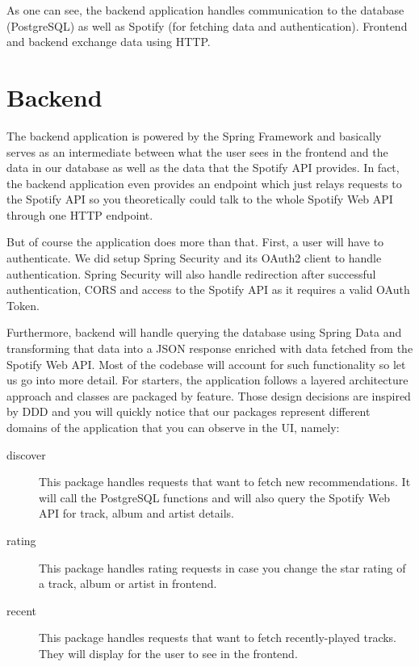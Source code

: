 As one can see, the backend application handles communication to the database (PostgreSQL) as well as Spotify (for fetching data and authentication). Frontend and backend exchange data using \ac{HTTP}.

\section{Backend}

The backend application is powered by the Spring Framework and basically serves as an intermediate between what the user sees in the frontend and the data in our database as well as the data that the Spotify API provides. In fact, the backend application even provides an endpoint which just relays requests to the Spotify API so you theoretically could talk to the whole Spotify Web API through one \ac{HTTP} endpoint.

But of course the application does more than that. First, a user will have to authenticate. We did setup Spring Security and its OAuth2 client to handle authentication. Spring Security will also handle redirection after successful authentication, \ac{CORS} and access to the Spotify API as it requires a valid OAuth Token.

Furthermore, backend will handle querying the database using Spring Data and transforming that data into a \acs{JSON} response enriched with data fetched from the Spotify Web API. Most of the codebase will account for such functionality so let us go into more detail. For starters, the application follows a layered architecture approach and classes are packaged by feature. Those design decisions are inspired by \ac{DDD} and you will quickly notice that our packages represent different domains of the application that you can observe in the \ac{UI}, namely:

\begin{description}
    \item[discover] This package handles requests that want to fetch new recommendations. It will call the PostgreSQL functions and will also query the Spotify Web API for track, album and artist details.
    \item[rating] This package handles rating requests in case you change the star rating of a track, album or artist in frontend.
    \item[recent] This package handles requests that want to fetch recently-played tracks. They will display for the user to see in the frontend.
\end{description}

